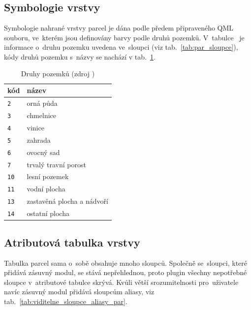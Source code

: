 \subsection{Symbologie vrstvy \texttt{}}
\label{symbologie_par}

Symbologie nahrané vrstvy parcel je dána podle předem připraveného QML
souboru, ve~kterém jsou definovány barvy podle druhů
pozemků. V~tabulce~\texttt{} je informace o~druhu pozemku
uvedena ve~sloupci \texttt{} (viz
tab.~\ref{tab:par_sloupce}), kódy druhů pozemku s~názvy se nachází v
tab.~\ref{tab:druhy_pozemku}.

\begin{table}[H]
    \begin{tabular}{|l|l|} \hline kód & název \\ \hline \hline
\texttt{2} & orná půda \\ \hline \texttt{3} & chmelnice \\ \hline
\texttt{4} & vinice \\ \hline \texttt{5} & zahrada \\ \hline
\texttt{6} & ovocný sad \\ \hline \texttt{7} & trvalý travní porost \\
\hline \texttt{10} & lesní pozemek \\ \hline \texttt{11} & vodní
plocha \\ \hline \texttt{13} & zastavěná plocha a nádvoří \\ \hline
\texttt{14} & ostatní plocha \\ \hline
    \end{tabular} \centering
    \caption[Druhy pozemků]{Druhy pozemků (zdroj
\citep{vyhlaska_357})}
    \label{tab:druhy_pozemku}
\end{table}

\newpage

\subsection{Atributová tabulka vrstvy \texttt{}}
\label{tabulka_par}

Tabulka parcel sama o~sobě obsahuje mnoho sloupců. Společně
se~sloupci, které přidává zásuvný modul, se stává nepřehlednou, proto
plugin všechny nepotřebné sloupce v~atributové tabulce skrývá. Kvůli
větší srozumitelnosti pro~uživatele navíc zásuvný modul přidává sloupcům
aliasy, viz tab.~\ref{tab:viditelne_sloupce_aliasy_par}.

